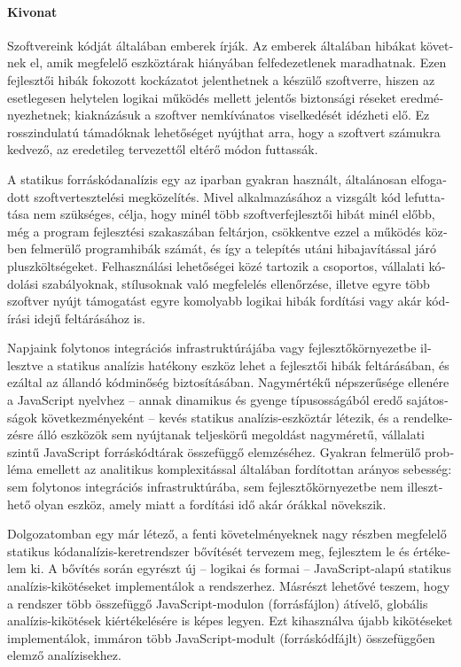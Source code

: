 \begin{otherlanguage}{magyar}

  \paragraph*{Kivonat}
  \thispagestyle{plain}

  Szoftvereink kódját általában emberek írják. Az emberek általában hibákat követnek el, amik megfelelő eszköztárak hiányában felfedezetlenek maradhatnak. Ezen fejlesztői hibák fokozott kockázatot jelenthetnek a készülő szoftverre, hiszen az esetlegesen helytelen logikai működés mellett jelentős biztonsági réseket eredményezhetnek; kiaknázásuk a szoftver nemkívánatos viselkedését idézheti elő. Ez rosszindulatú támadóknak lehetőséget nyújthat arra, hogy a szoftvert számukra kedvező, az eredetileg tervezettől eltérő módon futtassák.

  A statikus forráskódanalízis egy az iparban gyakran használt, általánosan elfogadott szoftvertesztelési megközelítés. Mivel alkalmazásához a vizsgált kód lefuttatása nem szükséges, célja, hogy minél több szoftverfejlesztői hibát minél előbb, még a program fejlesztési szakaszában feltárjon, csökkentve ezzel a működés közben felmerülő programhibák számát, és így a telepítés utáni hibajavítással járó pluszköltségeket. Felhasználási lehetőségei közé tartozik a csoportos, vállalati kódolási szabályoknak, stílusoknak való megfelelés ellenőrzése, illetve egyre több szoftver nyújt támogatást egyre komolyabb logikai hibák fordítási vagy akár kódírási idejű feltárásához is.

  Napjaink folytonos integrációs infrastruktúrájába vagy fejlesztőkörnyezetbe illesztve a statikus analízis hatékony eszköz lehet a fejlesztői hibák feltárásában, és ezáltal az állandó kódminőség biztosításában. Nagymértékű népszerűsége ellenére a JavaScript nyelvhez – annak dinamikus és gyenge típusosságából eredő sajátosságok következményeként – kevés statikus analízis-eszköztár létezik, és a rendelkezésre álló eszközök sem nyújtanak teljeskörű megoldást nagyméretű, vállalati szintű JavaScript forráskódtárak összefüggő elemzéséhez. Gyakran felmerülő probléma emellett az analitikus komplexitással általában fordítottan arányos sebesség: sem folytonos integrációs infrastruktúrába, sem fejlesztőkörnyezetbe nem illeszthető olyan eszköz, amely miatt a fordítási idő akár órákkal növekszik.

  Dolgozatomban egy már létező, a fenti követelményeknek nagy részben megfelelő statikus kódanalízis-keretrendszer bővítését tervezem meg, fejlesztem le és értékelem ki. A bővítés során egyrészt új – logikai és formai – JavaScript-alapú statikus analízis-kikötéseket implementálok a rendszerhez. Másrészt lehetővé teszem, hogy a rendszer több összefüggő JavaScript-modulon (forrásfájlon) átívelő, globális analízis-kikötések kiértékelésére is képes legyen. Ezt kihasználva újabb kikötéseket implementálok, immáron több JavaScript-modult (forráskódfájlt) összefüggően elemző analízisekhez.

\end{otherlanguage}

